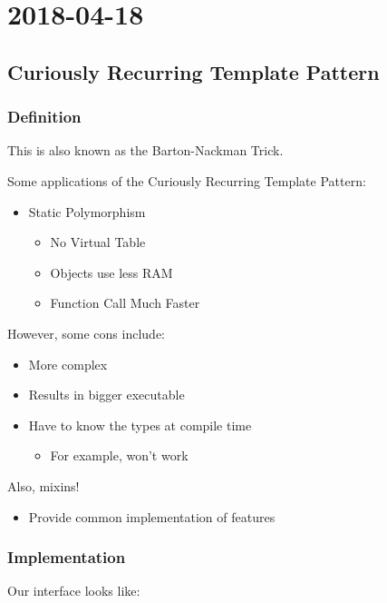 %
%
%

\section{2018-04-18}

\subsection{Curiously Recurring Template Pattern}

\subsubsection{Definition}

This is also known as the Barton-Nackman Trick.

Some applications of the Curiously Recurring Template Pattern:

\begin{itemize}
  \item Static Polymorphism
  \begin{itemize}
    \item No Virtual Table
    \item Objects use less RAM
    \item Function Call Much Faster
  \end{itemize}
\end{itemize}

However, some cons include:

\begin{itemize}
  \item More complex
  \item Results in bigger executable
  \item Have to know the types at compile time
  \begin{itemize}
    \item For example,  won't work
  \end{itemize}
\end{itemize}

Also, mixins!

\begin{itemize}
  \item Provide common implementation of features
\end{itemize}

\subsubsection{Implementation}
Our interface looks like:

